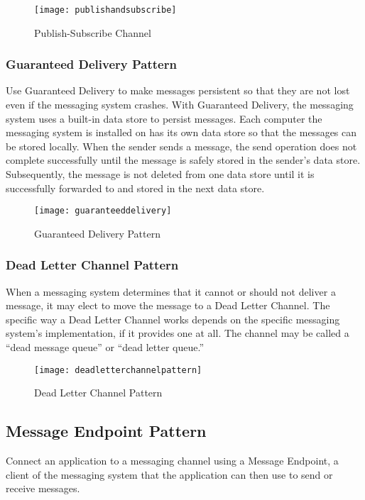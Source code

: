 \begin{figure}[H]
  \center
  \texttt{[image: publishandsubscribe]}
  \caption{Publish-Subscribe Channel}
\end{figure}

\subsubsection{Guaranteed Delivery Pattern}
Use Guaranteed Delivery to make messages persistent so that they are not lost even if the messaging system crashes.  With Guaranteed Delivery, the messaging system uses a built-in data store to persist messages. Each computer the messaging system is installed on has its own data store so that the messages can be stored locally. When the sender sends a message, the send operation does not complete successfully until the message is safely stored in the sender’s data store. Subsequently, the message is not deleted from one data store until it is successfully forwarded to and stored in the next data store.

\begin{figure}[H]
  \center
  \texttt{[image: guaranteeddelivery]}
  \caption{Guaranteed Delivery Pattern}
\end{figure}

\subsubsection{Dead Letter Channel Pattern}
When a messaging system determines that it cannot or should not deliver a message, it may elect to move the message to a Dead Letter Channel. The specific way a Dead Letter Channel works depends on the specific messaging system’s implementation, if it provides one at all. The channel may be called a “dead message queue” or “dead letter queue.”

\begin{figure}[H]
  \center
  \texttt{[image: deadletterchannelpattern]}
  \caption{Dead Letter Channel Pattern}
\end{figure}

\subsection{Message Endpoint Pattern}
Connect an application to a messaging channel using a Message Endpoint, a client of the messaging system that the application can then use to send or receive messages.

